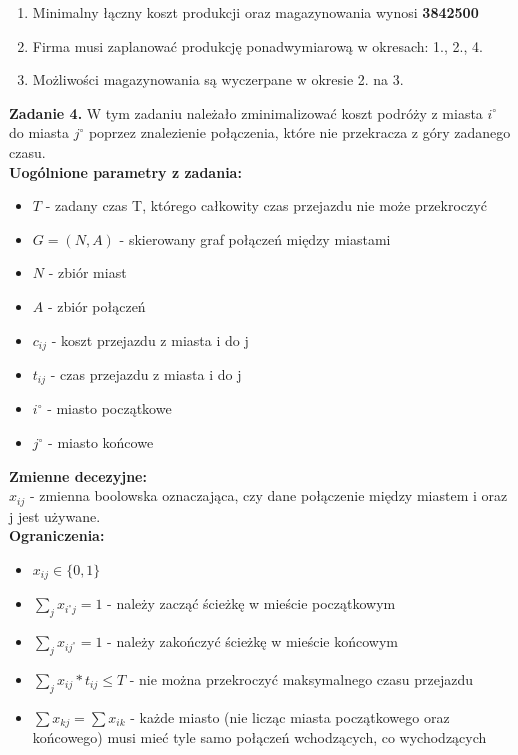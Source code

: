 \documentclass[15pt, a4paper]{article}
\begin{document}
\begin{enumerate}
    \item Minimalny łączny koszt produkcji oraz magazynowania wynosi \textbf{3842500}
    \item Firma musi zaplanować produkcję ponadwymiarową w okresach: 1., 2., 4.
    \item Możliwości magazynowania są wyczerpane w okresie 2. na 3.
\end{enumerate}

\vspace{0.5cm}

\noindent\hrulefill

\vspace{0.5cm}


\noindent\textbf{Zadanie 4.} W tym zadaniu należało zminimalizować koszt podróży z miasta \(i^\circ\) do miasta \(j^\circ\) poprzez znalezienie połączenia, które nie przekracza z góry zadanego czasu.\\

\noindent\textbf{Uogólnione parametry z zadania:}

\begin{itemize}
    \item \( T \) - zadany czas T, którego całkowity czas przejazdu nie może przekroczyć
    \item \( G = (N, A) \) - skierowany graf połączeń między miastami
    \item \( N \) - zbiór miast
    \item \( A \) - zbiór połączeń
    \item \( c_{ij} \) - koszt przejazdu z miasta i do j
    \item \( t_{ij} \) - czas przejazdu z miasta i do j
    \item \( i^\circ \) - miasto początkowe
    \item \( j^\circ \) - miasto końcowe 
\end{itemize} 

\noindent\textbf{Zmienne decezyjne:}\\

\noindent \(x_{ij}\) - zmienna boolowska oznaczająca, czy dane połączenie między miastem i oraz j jest używane.\\

\noindent\textbf{Ograniczenia:}

\begin{itemize}
    \item \(x_{ij} \in \{0, 1\} \)
    \item \(\sum_{j}x_{i^\circ j} = 1 \) - należy zacząć ścieżkę w mieście początkowym 
    \item \(\sum_{j}x_{ij^\circ} = 1 \) - należy zakończyć ścieżkę w mieście końcowym 
    \item \(\sum_{j}x_{ij} * t_{ij} \leq T \) - nie można przekroczyć maksymalnego czasu przejazdu
    \item \(\sum x_{kj} = \sum x_{ik} \) - każde miasto (nie licząc miasta początkowego oraz końcowego) musi mieć tyle samo połączeń wchodzących, co wychodzących
\end{itemize}
\end{document}
